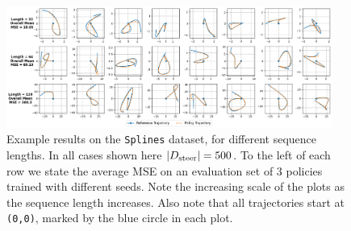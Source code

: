 \documentclass[nohyperref]{article}
\begin{document}
\begin{figure}[]
    \centering
    \includegraphics[width=0.95\textwidth,keepaspectratio]{figures/iclr_plots/splines_multi_lengths_grid.png}
    \caption{Example results on the \texttt{Splines} dataset, for different sequence lengths. In all cases shown here $|D_{\mathrm{steer}}|=500$. To the left of each row we state the average MSE on an evaluation set of 3 policies trained with different seeds. Note the increasing scale of the plots as the sequence length increases. Also note that all trajectories start at \texttt{(0,0)}, marked by the blue circle in each plot. }
    \label{fig:particle_splines_multi_lengths_grid}


\end{figure}
\end{document}
